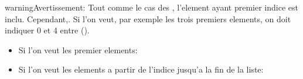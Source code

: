 \documentclass[letterpaper,10pt,french]{sphinxmanual}
\begin{document}
\begin{sphinxadmonition}{warning}{Avertissement:}
\sphinxAtStartPar
Tout comme le cas des , l’element ayant premier indice est inclu. Cependant,. Si l’on veut, par exemple les trois premiers elements, on doit indiquer 0 et 4 entre \sphinxcode{\sphinxupquote{{[}{]}}} (\sphinxcode{\sphinxupquote{{[}0:4{]}}}).
\begin{itemize}
\item {} 
\sphinxAtStartPar
Si l’on veut les  premier elements: \sphinxcode{\sphinxupquote{{[}:n+1{]}}}

\item {} 
\sphinxAtStartPar
Si l’on veut les elements a partir de l’indice  jusqu’a la fin de la liste: \sphinxcode{\sphinxupquote{{[}n:{]}}}

\end{itemize}
\end{sphinxadmonition}

\begin{sphinxVerbatim}[commandchars=\\\{\}]
  \PYG{p}{[}   \PYG{p}{]}
\PYG{p}{[}\PYG{p}{]}
\PYG{p}{[}\PYG{p}{]}

\PYG{p}{[}\PYG{p}{]}
\PYG{p}{[}\PYG{p}{]}

\PYG{p}{[}\PYG{p}{]}
\PYG{p}{[}\PYG{p}{]}

\PYG{p}{[}\PYG{p}{]}
\PYG{p}{[}\PYG{p}{]}

\PYG{p}{[}\PYG{p}{]}
\end{sphinxVerbatim}
\end{document}
